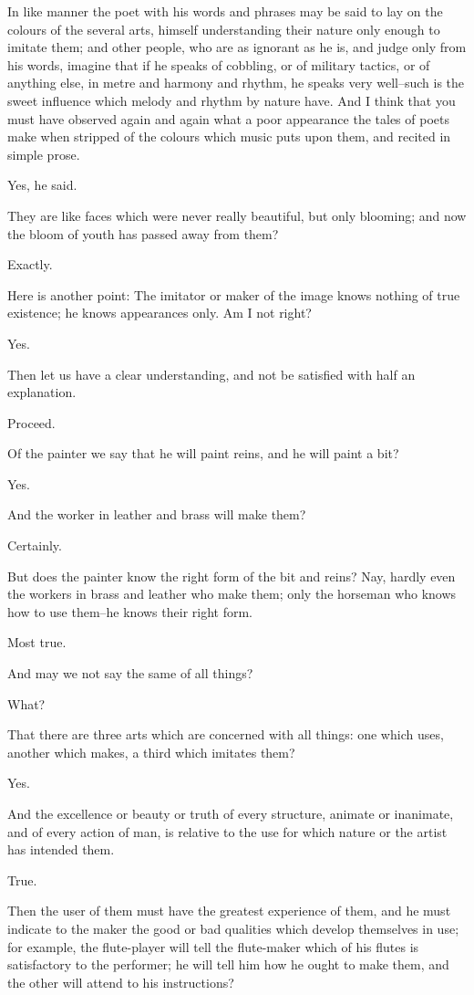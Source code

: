 In like manner the poet with his words and phrases may be said to lay on
the colours of the several arts, himself understanding their nature only
enough to imitate them; and other people, who are as ignorant as he is,
and judge only from his words, imagine that if he speaks of cobbling,
or of military tactics, or of anything else, in metre and harmony and
rhythm, he speaks very well--such is the sweet influence which melody
and rhythm by nature have. And I think that you must have observed again
and again what a poor appearance the tales of poets make when stripped
of the colours which music puts upon them, and recited in simple prose.

Yes, he said.

They are like faces which were never really beautiful, but only
blooming; and now the bloom of youth has passed away from them?

Exactly.

Here is another point: The imitator or maker of the image knows nothing
of true existence; he knows appearances only. Am I not right?

Yes.

Then let us have a clear understanding, and not be satisfied with half
an explanation.

Proceed.

Of the painter we say that he will paint reins, and he will paint a bit?

Yes.

And the worker in leather and brass will make them?

Certainly.

But does the painter know the right form of the bit and reins? Nay,
hardly even the workers in brass and leather who make them; only the
horseman who knows how to use them--he knows their right form.

Most true.

And may we not say the same of all things?

What?

That there are three arts which are concerned with all things: one which
uses, another which makes, a third which imitates them?

Yes.

And the excellence or beauty or truth of every structure, animate or
inanimate, and of every action of man, is relative to the use for which
nature or the artist has intended them.

True.

Then the user of them must have the greatest experience of them, and
he must indicate to the maker the good or bad qualities which develop
themselves in use; for example, the flute-player will tell the
flute-maker which of his flutes is satisfactory to the performer; he
will tell him how he ought to make them, and the other will attend to
his instructions?

